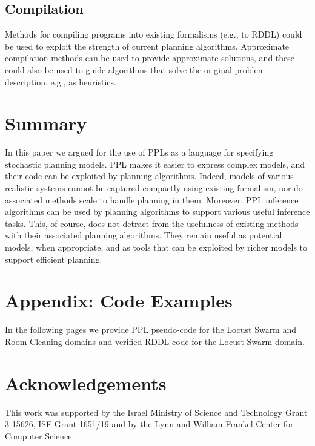 \documentclass[letterpaper]{article} %
\theoremstyle{definition}
\begin{document}
\subsection{Compilation}
Methods for compiling programs into existing formalisms (e.g., to RDDL) could be used to exploit the strength of current planning algorithms.  
Approximate compilation methods can be used to provide
approximate solutions, and these could also be used to guide algorithms that solve the original problem description, e.g., as heuristics.

\section{Summary}
In this paper we argued for the use of PPLs as a language for specifying stochastic planning models. PPL makes it easier to express complex models, and their code can be exploited by planning algorithms. Indeed, models of various realistic systems cannot be captured compactly using existing formalism,
nor do associated methods scale to handle planning in them.
Moreover, PPL inference algorithms can be used by planning algorithms to support various useful inference tasks. This, of course, does not detract from the usefulness of existing methods with their associated planning algorithms. They remain useful as potential models, when appropriate, and as tools that can be exploited by richer models to support efficient
planning.


%
\section{Appendix: Code Examples}
In the following pages we provide PPL pseudo-code for the Locust Swarm and
Room Cleaning domains and verified RDDL code for the Locust Swarm domain.
\onecolumn


\bigskip
\bigskip


\twocolumn
\section{Acknowledgements} 
This work was supported by the Israel Ministry of Science and Technology Grant 3-15626, ISF Grant 
1651/19 and by the Lynn and William Frankel Center for Computer Science.

\end{document}
